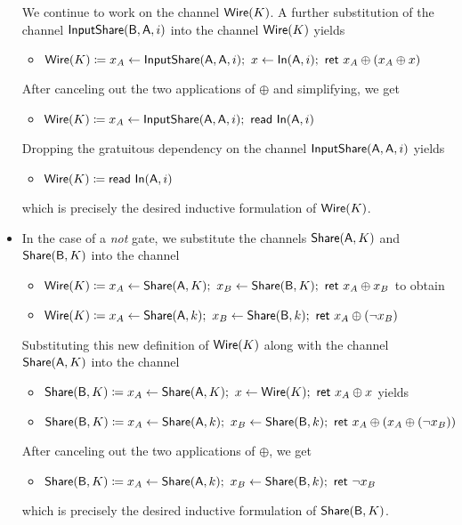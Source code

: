 \begin{itemize}
We continue to work on the channel $\mathsf{Wire}(K)$. A further substitution of the channel $\mathsf{InputShare}(\mathsf{B},\mathsf{A},i)$ into the channel $\mathsf{Wire}(K)$ yields
\begin{itemize}
\item $\mathsf{Wire}(K) \coloneqq x_A \leftarrow \mathsf{InputShare}(\mathsf{A},\mathsf{A},i); \ x \leftarrow \mathsf{In}(\mathsf{A},i); \ \mathsf{ret} \ x_A \oplus (x_A \oplus x)$
\end{itemize}
After canceling out the two applications of $\oplus$ and simplifying, we get
\begin{itemize}
\item $\mathsf{Wire}(K) \coloneqq x_A \leftarrow \mathsf{InputShare}(\mathsf{A},\mathsf{A},i); \ \mathsf{read} \ \mathsf{In}(\mathsf{A},i)$
\end{itemize}
Dropping the gratuitous dependency on the channel $\mathsf{InputShare}(\mathsf{A},\mathsf{A},i)$ yields
\begin{itemize}
\item $\mathsf{Wire}(K) \coloneqq \mathsf{read} \ \mathsf{In}(\mathsf{A},i)$
\end{itemize}
which is precisely the desired inductive formulation of $\mathsf{Wire}(K)$.
\item In the case of a \emph{not} gate, we substitute the channels $\mathsf{Share}(\mathsf{A},K)$ and $\mathsf{Share}(\mathsf{B},K)$ into the channel
\begin{itemize}
\item $\mathsf{Wire}(K) \coloneqq x_A \leftarrow \mathsf{Share}(\mathsf{A},K); \ x_B \leftarrow \mathsf{Share}(\mathsf{B},K); \ \mathsf{ret} \ x_A \oplus x_B$ to obtain 
\item $\mathsf{Wire}(K) \coloneqq x_A \leftarrow \mathsf{Share}(\mathsf{A},k); \ x_B \leftarrow \mathsf{Share}(\mathsf{B},k); \ \mathsf{ret} \ x_A \oplus (\neg x_B)$
\end{itemize}
Substituting this new definition of $\mathsf{Wire}(K)$ along with the channel $\mathsf{Share}(\mathsf{A},K)$ into the channel
\begin{itemize}
\item $\mathsf{Share}(\mathsf{B},K) \coloneqq x_A \leftarrow \mathsf{Share}(\mathsf{A},K); \ x \leftarrow \mathsf{Wire}(K); \ \mathsf{ret} \ x_A \oplus x$ yields
\item $\mathsf{Share}(\mathsf{B},K) \coloneqq x_A \leftarrow \mathsf{Share}(\mathsf{A},k); \ x_B \leftarrow \mathsf{Share}(\mathsf{B},k); \ \mathsf{ret} \ x_A \oplus (x_A \oplus (\neg x_B))$
\end{itemize}
After canceling out the two applications of $\oplus$, we get
\begin{itemize}
\item $\mathsf{Share}(\mathsf{B},K) \coloneqq x_A \leftarrow \mathsf{Share}(\mathsf{A},k); \ x_B \leftarrow \mathsf{Share}(\mathsf{B},k); \ \mathsf{ret} \ \neg x_B$
\end{itemize}
which is precisely the desired inductive formulation of $\mathsf{Share}(\mathsf{B},K)$.


\end{itemize}
